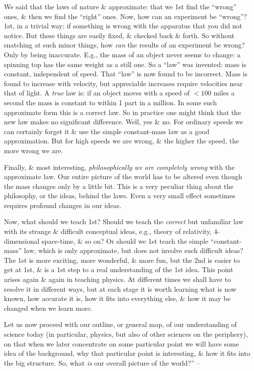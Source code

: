 \documentclass{article}
\begin{document}
We said that the laws of nature \& approximate: that we 1st find the ``wrong'' ones, \& then we find the ``right'' ones. Now, how can an experiment be ``wrong''? 1st, in a trivial way: if something is wrong with the apparatus that you did not notice. But these things are easily fixed, \& checked back \& forth. So without snatching at such minor things, how {\it can} the results of an experiment be wrong? Only by being inaccurate. E.g., the mass of an object never seems to change: a spinning top has the same weight as a still one. So a ``law'' was invented: mass is constant, independent of speed. That ``law'' is now found to be incorrect. Mass is found to increase with velocity, but appreciable increases require velocities near that of light. A {\it true} law is: if an object moves with a speed of $< 100$ miles a second the mass is constant to within 1 part in a million. In some such approximate form this is a correct law. So in practice one might think that the new law makes no significant difference. Well, yes \& no. For ordinary speeds we can certainly forget it \& use the simple constant-mass law as a good approximation. But for high speeds we are wrong, \& the higher the speed, the more wrong we are.

Finally, \& most interesting, {\it philosophically we are completely wrong} with the approximate law. Our entire picture of the world has to be altered even though the mass changes only by a little bit. This is a very peculiar thing about the philosophy, or the ideas, behind the laws. Even a very small effect sometimes requires profound changes in our ideas.

Now, what should we teach 1st? Should we teach the {\it correct} but unfamiliar law with its strange \& difficult conceptual ideas, e.g., theory of relativity, 4-dimensional space-time, \& so on? Or should we 1st teach the simple ``constant-mass'' law, which is only approximate, but does not involve such difficult ideas? The 1st is more exciting, more wonderful, \& more fun, but the 2nd is easier to get at 1st, \& is a 1st step to a real understanding of the 1st idea. This point arises again \& again in teaching physics. At different times we shall have to resolve it in different ways, but at each stage it is worth learning what is now known, how accurate it is, how it fits into everything else, \& how it may be changed when we learn more.

Let us now proceed with our outline, or general map, of our understanding of science today (in particular, physics, but also of other sciences on the periphery), on that when we later concentrate on some particular point we will have some idea of the background, why that particular point is interesting, \& how it fits into the big structure. So, what {\it is} our overall picture of the world?'' -- \cite[pp. 1--4]{Feyman_Leighton_Sands_6_easy_pieces}
\end{document}
